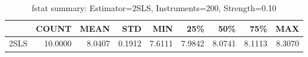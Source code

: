 \begin{table}[ht]
\centering
\caption{fstat summary: Estimator=2SLS, Instruments=200, Strength=0.10}
\begin{tabular}{lrrrrrrrr}
\toprule
 & COUNT & MEAN & STD & MIN & 25\% & 50\% & 75\% & MAX \\
\midrule
2SLS & 10.0000 & 8.0407 & 0.1912 & 7.6111 & 7.9842 & 8.0741 & 8.1113 & 8.3070 \\
\bottomrule
\end{tabular}
\end{table}
